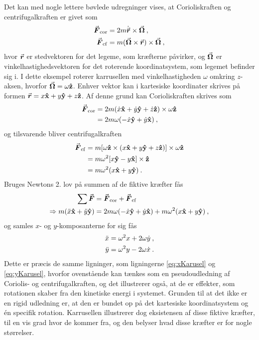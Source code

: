 \noindent
Det kan med nogle lettere bøvlede udregninger vises, at Corioliskraften og centrifugalkraften er givet som
%
\begin{equation} \label{eq:FiktiveKraefter}
\begin{aligned}
	{\vec{\boldsymbol{F}}}_\mathrm{cor} &= 2m\dot{{\vec{\boldsymbol{r}}}}\times{\vec{\boldsymbol{\Omega}}} \: , \\
	{\vec{\boldsymbol{F}}}_\mathrm{cf} &= m({\vec{\boldsymbol{\Omega}}} \times {\vec{\boldsymbol{r}}}) \times {\vec{\boldsymbol{\Omega}}} \: ,
\end{aligned}
\end{equation}
%
hvor ${\vec{\boldsymbol{r}}}$ er stedvektoren for det legeme, som kræfterne påvirker, og ${\vec{\boldsymbol{\Omega}}}$ er vinkelhastighedsvektoren for det roterende koordinatsystem, som legemet befinder sig i. I dette eksempel roterer karrusellen med vinkelhastigheden $\omega$ omkring $z$-aksen, hvorfor ${\vec{\boldsymbol{\Omega}}} = \omega\mathbf{\hat{z}}$. Enhver vektor kan i kartesiske koordinater skrives på formen ${\vec{\boldsymbol{r}}} = x\mathbf{\hat{x}} + y\mathbf{\hat{y}} + z\mathbf{\hat{z}}$. Af denne grund kan Corioliskraften skrives som
%
\begin{equation}
\begin{aligned}
	{\vec{\boldsymbol{F}}}_\mathrm{cor} &= 2m(\dot{x}\mathbf{\hat{x}} + \dot{y}\mathbf{\hat{y}} + \dot{z}\mathbf{\hat{z}}) \times \omega\mathbf{\hat{z}} \\
	&= 2m\omega(-\dot{x}\mathbf{\hat{y}} + \dot{y}\mathbf{\hat{x}}) \: ,
\end{aligned}
\end{equation}
%
og tilsvarende bliver centrifugalkraften
%
\begin{equation}
\begin{aligned}
	{\vec{\boldsymbol{F}}}_\mathrm{cf} &= m[\omega\mathbf{\hat{z}} \times (x\mathbf{\hat{x}} + y\mathbf{\hat{y}} + z\mathbf{\hat{z}})] \times \omega\mathbf{\hat{z}} \\
	&= m\omega^2[x\mathbf{\hat{y}} - y\mathbf{\hat{x}}] \times \mathbf{\hat{z}} \\
	&= m\omega^2(x\mathbf{\hat{x}} + y\mathbf{\hat{y}}) \: .
\end{aligned}
\end{equation}
%
Bruges Newtons 2. lov på summen af de fiktive kræfter fås
\begin{align}
	\sum{\vec{\boldsymbol{F}}} &= {\vec{\boldsymbol{F}}}_\mathrm{cor} + {\vec{\boldsymbol{F}}}_\mathrm{cf} \nonumber\\
	\Rightarrow m(\ddot{x}\mathbf{\hat{x}} + \ddot{y}\mathbf{\hat{y}}) &= 2m\omega(-\dot{x}\mathbf{\hat{y}} + \dot{y}\mathbf{\hat{x}}) + m\omega^2(x\mathbf{\hat{x}} + y\mathbf{\hat{y}}) \: ,
\end{align}
%
og samles $x$- og $y$-komposanterne for sig fås
%
\begin{equation}
	\begin{aligned}
		\ddot{x} &= \omega^2x + 2\omega\dot{y} \: , \\
		\ddot{y} &= \omega^2y - 2\omega\dot{x} \: .
	\end{aligned}
\end{equation}
%
Dette er præcis de samme ligninger, som ligningerne \eqref{eq:xKarusel} og \eqref{eq:yKarusel}, hvorfor ovenstående kan tænkes som en pseudoudledning af Coriolis- og centrifugalkraften, og det illustrerer også, at de er effekter, som rotationen skaber fra den kinetiske energi i systemet. Grunden til at det ikke er en rigid udledning er, at den er bundet op på det kartesiske koordinatsystem og én specifik rotation. Karrusellen illustrerer dog eksistensen af disse fiktive kræfter, til en vis grad hvor de kommer fra, og den belyser hvad disse kræfter er for nogle størrelser.


